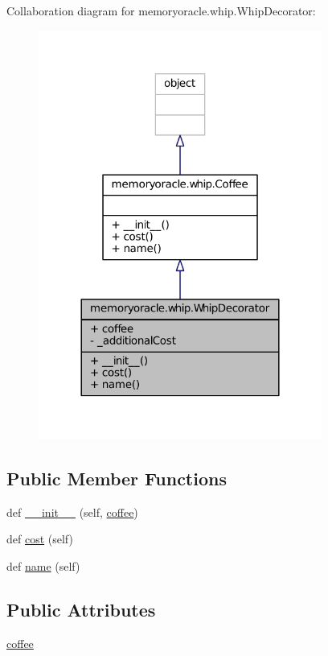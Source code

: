 Collaboration diagram for memoryoracle.\+whip.\+Whip\+Decorator\+:\nopagebreak
\begin{figure}[H]
\begin{center}
\leavevmode
\includegraphics[width=264pt]{classmemoryoracle_1_1whip_1_1WhipDecorator__coll__graph}
\end{center}
\end{figure}
\subsection*{Public Member Functions}
\begin{DoxyCompactItemize}
\item 
def \hyperlink{classmemoryoracle_1_1whip_1_1WhipDecorator_adc88600018521265b4e4ea31ae3cedc3}{\+\_\+\+\_\+init\+\_\+\+\_\+} (self, \hyperlink{classmemoryoracle_1_1whip_1_1WhipDecorator_a15614e10c214e40622bf7d2feaa54673}{coffee})
\item 
def \hyperlink{classmemoryoracle_1_1whip_1_1WhipDecorator_af7cd7acff72c5c50a4e762e41fdca1ca}{cost} (self)
\item 
def \hyperlink{classmemoryoracle_1_1whip_1_1WhipDecorator_a1896ad782902459bf19b6c852dd82eed}{name} (self)
\end{DoxyCompactItemize}
\subsection*{Public Attributes}
\begin{DoxyCompactItemize}
\item 
\hyperlink{classmemoryoracle_1_1whip_1_1WhipDecorator_a15614e10c214e40622bf7d2feaa54673}{coffee}
\end{DoxyCompactItemize}

